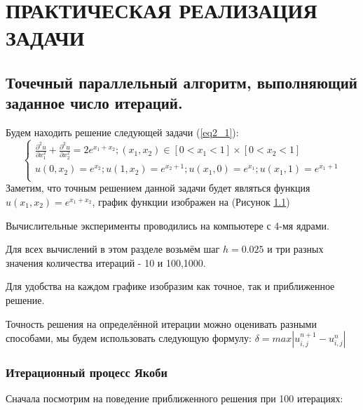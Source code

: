\documentclass[a4paper, 14pt]{extreport}
\begin{document}
	\newpage
	\chapter{ПРАКТИЧЕСКАЯ РЕАЛИЗАЦИЯ ЗАДАЧИ }
	\section{Точечный параллельный алгоритм, выполняющий заданное число итераций. }
	Будем находить решение следующей задачи (\ref{eq2_1}):
	\begin{equation}\label{eq2_1} 
		\begin{cases}
			\frac{\partial^2 u}{\partial x_1^2} + \frac{\partial^2 u}{\partial x_2^2} = 2e^{x_1+x_2}; (x_1, x_2) \in [0<x_1<1]\times[0<x_2<1] \\
			u(0, x_2)=e^{x_2}; u(1, x_2)=e^{x_2+1}; u(x_1, 0)=e^{x_1}; u(x_1, 1)=e^{x_1+1}  \\
		\end{cases}
	\end{equation}
	Заметим, что точным решением данной задачи будет являться функция $u(x_1,x_2)=e^{x_1+x_2 }$, график функции изображен на (Рисунок \ref{i2_1})
	\begin{figure}[h]
		\begin{center}
			\label{i2_1}
		\end{center}
	\end{figure}

	Вычислительные эксперименты проводились на компьютере с 4-мя ядрами.
	
	Для всех вычислений в этом разделе возьмём шаг $h=0.025$ и три разных значения количества итераций - 10 и 100,1000.
	
	Для удобства на каждом графике изобразим как точное, так и приближенное решение.
	
	Точность решения на определённой итерации можно оценивать разными способами, мы будем использовать следующую формулу:
$\delta = max|u_{i,j}^{n+1} - u_{i,j}^n|$
	
	\subsection{Итерационный процесс Якоби }
	Сначала посмотрим на поведение приближенного решения при 100 итерациях:
	
\end{document}
